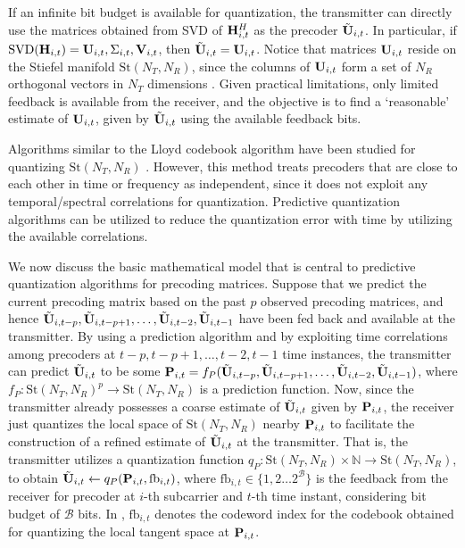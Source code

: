 \documentclass[conference]{IEEEtran}
\begin{document}
If an infinite bit budget is available for quantization, the transmitter can directly use the matrices obtained from SVD of ${\bf H}^{H}_{i,t}$ as the precoder $\tilde{{\bf U}}_{i,t}$.
In particular, if $\text{SVD}({\bf H}_{i,t}) = {\bf U}_{i,t},\Sigma_{i,t}, {\bf V}_{i,t}$, then $\tilde{{\bf U}}_{i,t} = {\bf U}_{i,t}$.
Notice that matrices ${\bf U}_{i,t}$ reside on the Stiefel manifold $\text{St}(N_T,N_R)$, since the columns of ${\bf U}_{i,t}$ form a set of $N_R$ orthogonal vectors in $N_T$ dimensions \cite{Gupt1905:Predictive,6891198}.
Given practical limitations, only limited feedback is available from the receiver, and the objective is to find a `reasonable' estimate of ${\bf U}_{i,t}$, given by $\tilde{{\bf U}}_{i,t}$ using the available feedback bits.

Algorithms similar to the Lloyd codebook algorithm have been studied for quantizing $\text{St}(N_T,N_R)$ \cite{6678348}.
However, this method treats precoders that are close to each other in time or frequency as independent, since it does not exploit any temporal/spectral correlations for quantization.
Predictive quantization algorithms \cite{Gupt1905:Predictive,6891198} can be utilized to reduce the quantization error with time by utilizing the available correlations.

We now discuss the basic mathematical model that is central to predictive quantization algorithms for precoding matrices.
Suppose that we predict the current precoding matrix based on the past $p$ observed precoding matrices, and hence $\tilde{{\bf U}}_{i,t-p},\tilde{{\bf U}}_{i,t-p+1},\ldots,\tilde{{\bf U}}_{i,t-2},\tilde{{\bf U}}_{i,t-1}$ have been fed back and available at the transmitter.
By using a prediction algorithm  and by exploiting time correlations among precoders at $t-p,t-p+1,\ldots,t-2,t-1$ time instances, the transmitter can predict $\tilde{{\bf U}}_{i,t}$ to be some ${\bf P}_{i,t}=f_P(\tilde{{\bf U}}_{i,t-p},\tilde{{\bf U}}_{i,t-p+1},\ldots,\tilde{{\bf U}}_{i,t-2},\tilde{{\bf U}}_{i,t-1})$, where $f_P: \text{St}(N_T,N_R)^p \to \text{St}(N_T,N_R)$ is a prediction function.
Now, since the transmitter already possesses a coarse estimate of $\tilde{{\bf U}}_{i,t}$ given by ${\bf P}_{i,t}$, the receiver just quantizes the local space of $\text{St}(N_T,N_R)$ nearby ${\bf P}_{i,t}$ to facilitate the construction of a refined estimate of $\tilde{{\bf U}}_{i,t}$ at the transmitter.
That is, the transmitter utilizes a quantization function $q_P:\text{St}(N_T,N_R) \times \mathbb{N} \to \text{St}(N_T,N_R)$, to obtain $\tilde{{\bf U}}_{i,t} \gets q_P({\bf P}_{i,t},\text{fb}_{i,t})$, where $\text{fb}_{i,t} \in \{1,2\ldots2^{\mathcal{B}}\}$ is the feedback from the receiver for precoder at $i$-th subcarrier and $t$-th time instant, considering bit budget of $\mathcal{B}$ bits.
In \cite{Gupt1905:Predictive,6891198,6545375}, $\text{fb}_{i,t}$ denotes the codeword index for the codebook obtained for quantizing the local tangent space at ${\bf P}_{i,t}$.
\end{document}
